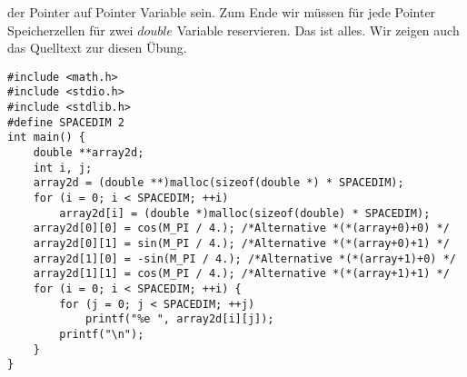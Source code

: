 der Pointer auf Pointer Variable sein. Zum Ende wir müssen für jede Pointer Speicherzellen 
für zwei $double$ Variable reservieren. Das ist alles. Wir zeigen auch das Quelltext zur diesen
Übung.
\begin{lstlisting}
#include <math.h>
#include <stdio.h>
#include <stdlib.h>
#define SPACEDIM 2
int main() {
    double **array2d;
    int i, j;
    array2d = (double **)malloc(sizeof(double *) * SPACEDIM);
    for (i = 0; i < SPACEDIM; ++i)
        array2d[i] = (double *)malloc(sizeof(double) * SPACEDIM);
    array2d[0][0] = cos(M_PI / 4.); /*Alternative *(*(array+0)+0) */
    array2d[0][1] = sin(M_PI / 4.); /*Alternative *(*(array+0)+1) */
    array2d[1][0] = -sin(M_PI / 4.); /*Alternative *(*(array+1)+0) */
    array2d[1][1] = cos(M_PI / 4.); /*Alternative *(*(array+1)+1) */
    for (i = 0; i < SPACEDIM; ++i) {
        for (j = 0; j < SPACEDIM; ++j)
            printf("%e ", array2d[i][j]);
        printf("\n");
    }
}
\end{lstlisting}
